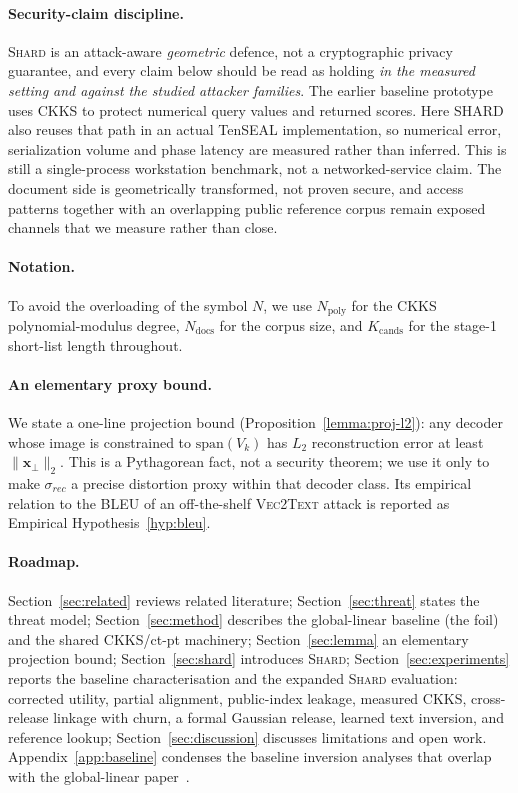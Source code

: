 \documentclass[11pt,a4paper]{article}
\begin{document}
\paragraph{Security-claim discipline.} \textsc{Shard} is an attack-aware
\emph{geometric} defence, not a cryptographic privacy guarantee, and every
claim below should be read as holding \emph{in the measured setting and
against the studied attacker families}. The earlier baseline prototype uses
CKKS to protect numerical query values and returned scores. Here SHARD also
reuses that path in an actual TenSEAL implementation, so numerical error,
serialization volume and phase latency are measured rather than inferred.
This is still a single-process workstation benchmark, not a networked-service
claim. The document side is geometrically transformed, not proven secure, and
access patterns together with an overlapping public reference corpus remain
exposed channels that we measure rather than close.

\paragraph{Notation.} To avoid the overloading of the symbol $N$, we use
$N_{\mathrm{poly}}$ for the CKKS polynomial-modulus degree,
$N_{\mathrm{docs}}$ for the corpus size, and $K_{\mathrm{cands}}$ for the
stage-1 short-list length throughout.

\paragraph{An elementary proxy bound.} We state a one-line projection
bound (Proposition~\ref{lemma:proj-l2}): any decoder whose image is
constrained to $\mathrm{span}(V_k)$ has $L_2$ reconstruction error at
least $\|\mathbf{x}_\perp\|_2$. This is a Pythagorean fact, not a security
theorem; we use it only to make $\sigma_{rec}$ a precise distortion proxy
within that decoder class. Its empirical relation to the BLEU of an
off-the-shelf \textsc{Vec2Text} attack is reported as Empirical
Hypothesis~\ref{hyp:bleu}.

\paragraph{Roadmap.} Section~\ref{sec:related} reviews related
literature; Section~\ref{sec:threat} states the threat model;
Section~\ref{sec:method} describes the global-linear baseline (the foil)
and the shared CKKS/ct-pt machinery;
Section~\ref{sec:lemma} an elementary projection bound;
Section~\ref{sec:shard} introduces \textsc{Shard};
Section~\ref{sec:experiments} reports the baseline characterisation and the
expanded \textsc{Shard} evaluation: corrected utility, partial alignment,
public-index leakage, measured CKKS, cross-release linkage with churn, a
formal Gaussian release, learned text inversion, and reference lookup;
Section~\ref{sec:discussion} discusses limitations and open work.
Appendix~\ref{app:baseline} condenses the baseline inversion analyses
that overlap with the global-linear paper~\cite{ref_alpha}.
\end{document}
